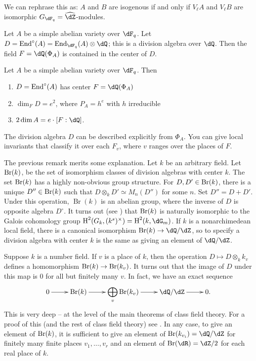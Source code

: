 We can rephrase this as: $A$ and $B$ are isogenous if and only if 
$V_\ell A$ and $V_\ell B$ are isomorphic $G_{\dF_q}=\widehat\dZ$-modules.

Let $A$ be a simple abelian variety over $\dF_q$. Let 
$D=\End^\circ(A)=\End_{\dF_q}(A)\otimes\dQ$; this is a division algebra over 
$\dQ$. Then the field $F=\dQ(\Phi_A)$ is contained in the 
center of $D$. 

\begin{theorem}
Let $A$ be a simple abelian variety over $\dF_q$. Then 
\begin{enumerate}
  \item $D=\operatorname{End}^\circ(A)$ has center $F=\dQ(\Phi_A)$ 
  \item $\dim_F D = e^2$, where $P_A =h^e$ with $h$ irreducible
  \item $2\dim A = e\cdot [F:\dQ]$. 
\end{enumerate}
\end{theorem}

The division algebra $D$ can be described explicitly from $\Phi_A$. You can 
give local invariants that classify it over each $F_v$, where $v$ ranges over 
the places of $F$. 

The previous remark merits some explanation. Let $k$ be an arbitrary field. 
Let $\operatorname{Br}(k)$, be the set of isomorphism classes of division algebras with 
center $k$. The set $\operatorname{Br}(k)$ has a highly non-obvious group structure. For 
$D,D'\in \operatorname{Br}(k)$, there is a unique $D''\in \operatorname{Br}(k)$ such that 
$D\otimes_k D'\simeq M_n(D'')$ for some $n$. Set $D''=D+D'$. Under this 
operation, $\operatorname{Br}(k)$ is an abelian group, where the inverse of 
$D$ is opposite algebra $D^\circ$. It turns out (see 
\cite[X.5]{se79}) that $\operatorname{Br}(k)$ is naturally isomorphic to the Galois 
cohomology group $\h^2(G_k,(k^s)^\times) = \h^2(k,\dG_m)$. If $k$ is a 
nonarchimedean local field, there is a canonical isomorphism 
$\brauer(k) \to \dQ/\dZ$, so to specify a division algebra with center $k$ is 
the same as giving an element of $\dQ/\dZ$. 

Suppose $k$ is a number field. If $v$ is a place of $k$, then the operation 
$D\mapsto D\otimes_k k_v$ defines a homomorphism $\operatorname{Br}(k) \to \operatorname{Br}(k_v)$. 
It turns out that the image of $D$ under this map is $0$ for all but finitely 
many $v$. In fact, we have an exact sequence
\[\xymatrix{
  0 \ar[r] 
    & \brauer(k) \ar[r] 
    & \displaystyle\bigoplus_v \brauer(k_v) \ar[r] 
    & \dQ/\dZ \ar[r] 
    & 0 \text{.}
}\]
This is very deep -- at the level of the main theorems of class field theory. 
For a proof of this (and the rest of class field theory) see 
\cite[2.86]{sh92}. In any case, to give an element of $\operatorname{Br}(k)$, it is 
sufficient to  give an element of $\brauer(k_{v_i})=\dQ/\dZ$ for finitely many 
finite places $v_1,\dots,v_r$ and an element of $\brauer(\dR)=\dZ/2$ for each 
real place of $k$.


